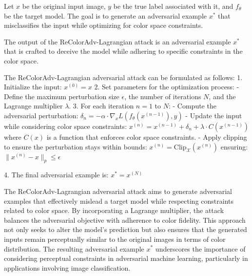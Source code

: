 Let $x$ be the original input image, $y$ be the true label associated with it, and $f_{\theta}$ be the target model. The goal is to generate an adversarial example $x^*$ that misclassifies the input while optimizing for color space constraints.

The output of the ReColorAdv-Lagrangian attack is an adversarial example $x^*$ that is crafted to deceive the model while adhering to specific constraints in the color space.

The ReColorAdv-Lagrangian adversarial attack can be formulated as follows:
1. Initialize the input:
   $x^{(0)} = x$
2. Set parameters for the optimization process:
   - Define the maximum perturbation size $\epsilon$, the number of iterations $N$, and the Lagrange multiplier $\lambda$.
3. For each iteration $n = 1$ to $N$:
   - Compute the adversarial perturbation:
   $\delta_n = -\alpha \cdot \nabla_x L(f_{\theta}(x^{(n-1)}), y)$
   - Update the input while considering color space constraints:
   $x^{(n)} = x^{(n-1)} + \delta_n + \lambda \cdot C(x^{(n-1)})$
   where $C(x)$ is a function that enforces color space constraints.
   - Apply clipping to ensure the perturbation stays within bounds:
   $x^{(n)} = \text{Clip}_{\mathcal{X}}(x^{(n)})$
   ensuring:
   $\|x^{(n)} - x\|_p \leq \epsilon$

4. The final adversarial example is:
   $x^* = x^{(N)}$

The ReColorAdv-Lagrangian adversarial attack aims to generate adversarial examples that effectively mislead a target model while respecting constraints related to color space. By incorporating a Lagrange multiplier, the attack balances the adversarial objective with adherence to color fidelity. This approach not only seeks to alter the model's prediction but also ensures that the generated inputs remain perceptually similar to the original images in terms of color distribution. The resulting adversarial example $x^*$ underscores the importance of considering perceptual constraints in adversarial machine learning, particularly in applications involving image classification.
